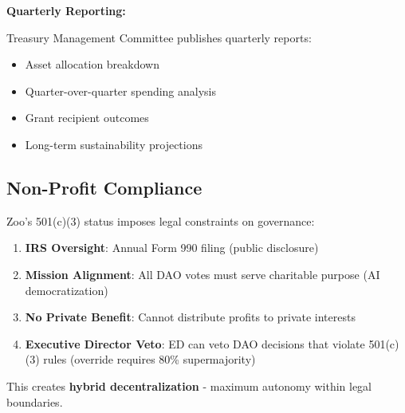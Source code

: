 \textbf{Quarterly Reporting:}

Treasury Management Committee publishes quarterly reports:
\begin{itemize}
\item Asset allocation breakdown
\item Quarter-over-quarter spending analysis
\item Grant recipient outcomes
\item Long-term sustainability projections
\end{itemize}

\subsection{Non-Profit Compliance}

Zoo's 501(c)(3) status imposes legal constraints on governance:

\begin{enumerate}
\item \textbf{IRS Oversight}: Annual Form 990 filing (public disclosure)
\item \textbf{Mission Alignment}: All DAO votes must serve charitable purpose (AI democratization)
\item \textbf{No Private Benefit}: Cannot distribute profits to private interests
\item \textbf{Executive Director Veto}: ED can veto DAO decisions that violate 501(c)(3) rules (override requires 80\% supermajority)
\end{enumerate}

This creates \textbf{hybrid decentralization} - maximum autonomy within legal boundaries.

